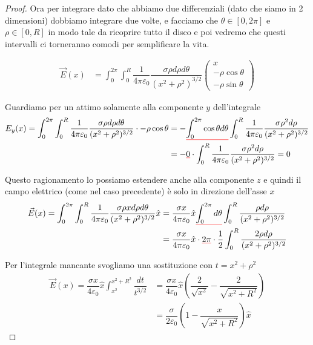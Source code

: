 \documentclass{rapport}
\def\mathunderline#1#2{\color{#1}\underline{{\color{black}#2}}\color{black}}
\begin{document}
\begin{proof}
Ora per integrare dato che abbiamo due differenziali (dato che siamo in 2 dimensioni) dobbiamo integrare due volte, e facciamo che $\theta\in[0, 2\pi]$ e $\rho\in[0, R]$ in modo tale da ricoprire tutto il disco e poi vedremo che questi intervalli ci torneranno comodi per semplificare la vita.

\begin{align*}
  \vec{E}(x) &= \int_{0}^{2\pi} \int_{0}^{R} \dfrac{1}{4\pi\varepsilon_0} \dfrac{\sigma \rho d\rho d\theta}{(x^2+\rho^2)^{3/2}} \begin{pmatrix}
  x \\
  -\rho\cos\theta\\
  -\rho\sin\theta 
\end{pmatrix} 
\end{align*}

Guardiamo per un attimo solamente alla componente $y$ dell'integrale 
\begin{align*}
E_y(x) = \int_{0}^{2\pi} \int_{0}^{R} \dfrac{1}{4\pi\varepsilon_0} \dfrac{\sigma \rho d\rho d\theta}{(x^2+\rho^2)^{3/2}} \cdot -\rho\cos\theta &= -\mathunderline{red}{\int_{0}^{2\pi}\cos\theta  d\theta}  \int_{0}^{R} \dfrac{1}{4\pi\varepsilon_0} \dfrac{\sigma \rho^2 d\rho}{(x^2+\rho^2)^{3/2}} \\
&= -\mathunderline{red}{0} \cdot \int_{0}^{R} \dfrac{1}{4\pi\varepsilon_0} \dfrac{\sigma \rho^2 d\rho}{(x^2+\rho^2)^{3/2}}  = 0
\end{align*}

Questo ragionamento lo possiamo estendere anche alla componente $z$ e quindi il campo elettrico (come nel caso precedente) è solo in direzione dell'asse $x$
\begin{align*}
  \vec{E}(x) = \int_{0}^{2\pi} \int_{0}^{R} \dfrac{1}{4\pi\varepsilon_0} \dfrac{\sigma \rho x d\rho d\theta}{(x^2+\rho^2)^{3/2}} \hat{x} &= \dfrac{\sigma x}{4\pi\varepsilon_0}\hat{x} \mathunderline{red}{\int_{0}^{2\pi}d\theta} \int_{0}^{R}  \dfrac{\rho d\rho }{(x^2+\rho^2)^{3/2}}  \\
   &= \dfrac{\sigma x}{4\pi\varepsilon_0}\hat{x}\cdot \mathunderline{red}{2\pi} \cdot \dfrac{1}{2} \int_{0}^{R}  \dfrac{2\rho d\rho }{(x^2+\rho^2)^{3/2}} 
\end{align*}

Per l'integrale mancante svogliamo una sostituzione con $t = x^2+\rho^2$
\begin{align*}
  \vec{E}(x)  = \dfrac{\sigma x}{4\varepsilon_0}\hat{x} \int_{x^2}^{x^2+R^2}  \dfrac{dt }{t^{3/2}} &= \dfrac{\sigma x}{4\varepsilon_0}\hat{x} \left(\dfrac{2}{\sqrt{x^2}} -\dfrac{2}{\sqrt{x^2+R^2}} \right)\\
   &= \dfrac{\sigma }{2\varepsilon_0} \left(1 -\dfrac{x}{\sqrt{x^2+R^2}} \right)\hat{x}
\end{align*}


\end{proof}
\end{document}
